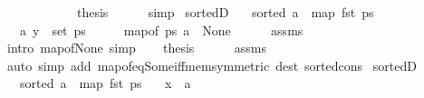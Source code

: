 \begin{isabellebody}
\ \ \ \ \ \ \isacommand{{\isachardot}{\kern0pt}}\isamarkupfalse%
\ \isacommand{{\isacharbraceright}{\kern0pt}}\isamarkupfalse%
\isanewline
\ \ \isamarkupfalse%
\ {\isacharquery}{\kern0pt}thesis\isanewline
\ \ \ \ \isamarkupfalse%
\ simp\isanewline
{}\isamarkupfalse%
%
\endisatagproof
{\isafoldproof}%
%
\isadelimproof
\isanewline
%
\endisadelimproof
\isanewline
\isanewline
{}\isamarkupfalse%
\ sorted{}D{\isacharcolon}{\kern0pt}\isanewline
\ \ \ {\isachardoublequoteopen}sorted\ {\isacharparenleft}{\kern0pt}a\ {\isacharhash}{\kern0pt}\ map\ fst\ ps{\isacharparenright}{\kern0pt}{\isachardoublequoteclose}\isanewline
\ \ \ {\isachardoublequoteopen}{\isacharparenleft}{\kern0pt}a{\isacharcomma}{\kern0pt}\ y{\isacharparenright}{\kern0pt}\ {\isasymnotin}\ set\ ps{\isachardoublequoteclose}\isanewline
%
\isadelimproof
%
\endisadelimproof
%
\isatagproof
{}\isamarkupfalse%
\ {\isacharminus}{\kern0pt}\isanewline
\ \ \isamarkupfalse%
\ {\isachardoublequoteopen}map{\isacharunderscore}{\kern0pt}of\ ps\ a\ {\isacharequal}{\kern0pt}\ None{\isachardoublequoteclose}\isanewline
\ \ \ \ \isamarkupfalse%
\ assms\isanewline
\ \ \ \ \isamarkupfalse%
\ {\isacharparenleft}{\kern0pt}intro\ map{\isacharunderscore}{\kern0pt}of{\isacharunderscore}{\kern0pt}None{\isacharparenright}{\kern0pt}\ simp\isanewline
\ \ \isamarkupfalse%
\ {\isacharquery}{\kern0pt}thesis\isanewline
\ \ \ \ \isamarkupfalse%
\ assms\isanewline
\ \ \ \ \isamarkupfalse%
\ {\isacharparenleft}{\kern0pt}auto\ simp\ add{\isacharcolon}{\kern0pt}\ map{\isacharunderscore}{\kern0pt}of{\isacharunderscore}{\kern0pt}eq{\isacharunderscore}{\kern0pt}Some{\isacharunderscore}{\kern0pt}iff{\isacharunderscore}{\kern0pt}mem{\isacharbrackleft}{\kern0pt}symmetric{\isacharbrackright}{\kern0pt}\ dest{\isacharcolon}{\kern0pt}\ sorted{\isacharunderscore}{\kern0pt}cons{\isacharparenright}{\kern0pt}\isanewline
{}\isamarkupfalse%
%
\endisatagproof
{\isafoldproof}%
%
\isadelimproof
\isanewline
%
\endisadelimproof
\isanewline
{}\isamarkupfalse%
\ sorted{}D{\isacharunderscore}{\kern0pt}{}{\isacharcolon}{\kern0pt}\isanewline
\ \ \ {\isachardoublequoteopen}sorted\ {\isacharparenleft}{\kern0pt}a\ {\isacharhash}{\kern0pt}\ map\ fst\ ps{\isacharparenright}{\kern0pt}{\isachardoublequoteclose}\isanewline
\ \ \ {\isachardoublequoteopen}x\ {\isacharless}{\kern0pt}\ a{\isachardoublequoteclose}\isanewline

\end{isabellebody}

